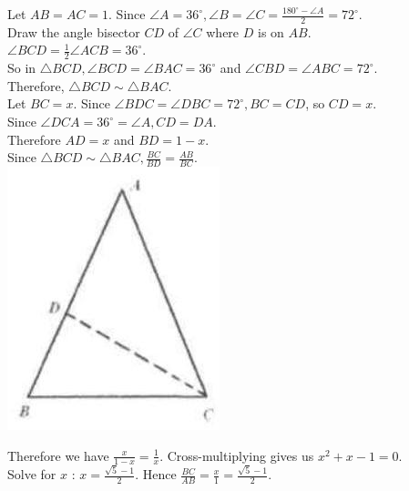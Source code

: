 \documentclass{article}
\begin{document}
Let \(A B=A C=1\). Since \(\angle A=36^{\circ}, \angle B=\angle C=\frac{180^{\circ}-\angle A}{2}=72^{\circ}\).\\
Draw the angle bisector \(C D\) of \(\angle C\) where \(D\) is on \(A B\).\\
\(\angle B C D=\frac{1}{2} \angle A C B=36^{\circ}\).\\
So in \(\triangle B C D, \angle B C D=\angle B A C=36^{\circ}\) and \(\angle C B D=\angle A B C=72^{\circ}\).\\
Therefore, \(\triangle B C D \sim \triangle B A C\).\\
Let \(B C=x\). Since \(\angle B D C=\angle D B C=72^{\circ}, B C=C D\), so \(C D=x\).\\
Since \(\angle D C A=36^{\circ}=\angle A, C D=D A\).\\
Therefore \(A D=x\) and \(B D=1-x\).\\
Since \(\triangle B C D \sim \triangle B A C, \frac{B C}{B D}=\frac{A B}{B C}\).\\
\centering
\includegraphics[width=\textwidth]{images/reasoning_image_1.jpg}

Therefore we have \(\frac{x}{1-x}=\frac{1}{x}\). Cross-multiplying gives us \(x^{2}+x-1=0\).\\
Solve for \(x\) : \(x=\frac{\sqrt{5}-1}{2}\). Hence \(\frac{B C}{A B}=\frac{x}{1}=\frac{\sqrt{5}-1}{2}\).\\
\end{document}
